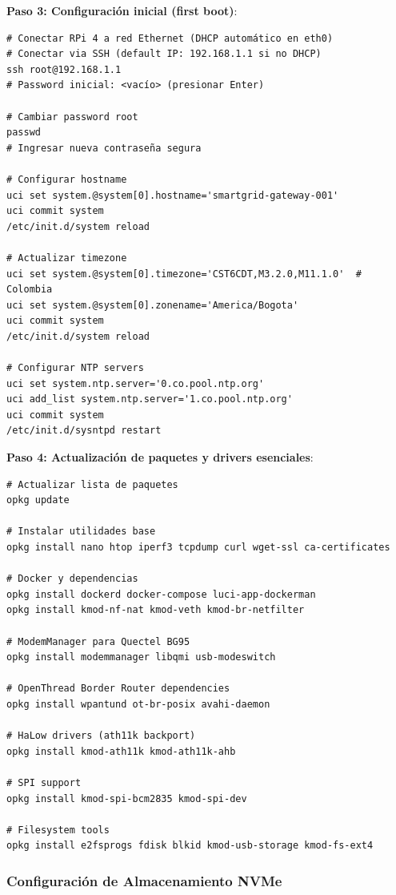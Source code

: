 \textbf{Paso 3: Configuración inicial (first boot)}:
\begin{verbatim}
# Conectar RPi 4 a red Ethernet (DHCP automático en eth0)
# Conectar via SSH (default IP: 192.168.1.1 si no DHCP)
ssh root@192.168.1.1
# Password inicial: <vacío> (presionar Enter)

# Cambiar password root
passwd
# Ingresar nueva contraseña segura

# Configurar hostname
uci set system.@system[0].hostname='smartgrid-gateway-001'
uci commit system
/etc/init.d/system reload

# Actualizar timezone
uci set system.@system[0].timezone='CST6CDT,M3.2.0,M11.1.0'  # Colombia
uci set system.@system[0].zonename='America/Bogota'
uci commit system
/etc/init.d/system reload

# Configurar NTP servers
uci set system.ntp.server='0.co.pool.ntp.org'
uci add_list system.ntp.server='1.co.pool.ntp.org'
uci commit system
/etc/init.d/sysntpd restart
\end{verbatim}

\textbf{Paso 4: Actualización de paquetes y drivers esenciales}:
\begin{verbatim}
# Actualizar lista de paquetes
opkg update

# Instalar utilidades base
opkg install nano htop iperf3 tcpdump curl wget-ssl ca-certificates

# Docker y dependencias
opkg install dockerd docker-compose luci-app-dockerman
opkg install kmod-nf-nat kmod-veth kmod-br-netfilter

# ModemManager para Quectel BG95
opkg install modemmanager libqmi usb-modeswitch

# OpenThread Border Router dependencies
opkg install wpantund ot-br-posix avahi-daemon

# HaLow drivers (ath11k backport)
opkg install kmod-ath11k kmod-ath11k-ahb

# SPI support
opkg install kmod-spi-bcm2835 kmod-spi-dev

# Filesystem tools
opkg install e2fsprogs fdisk blkid kmod-usb-storage kmod-fs-ext4
\end{verbatim}

\subsubsection{Configuración de Almacenamiento NVMe}

